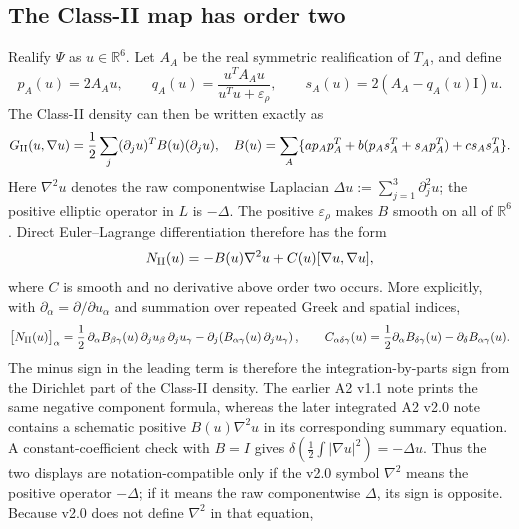 \documentclass[11pt]{article}
\numberwithin{equation}{section}
\theoremstyle{definition}
\newcommand{\R}{\mathbb R}
\newcommand{\Id}{\mathrm I}
\newcommand{\eps}{\varepsilon}
\begin{document}
\subsection{The Class-II map has order two}

Realify $\Psi$ as $u\in\R^6$.  Let $A_A$ be the real symmetric realification
of $T_A$, and define
\begin{equation}
 p_A(u)=2A_Au,\qquad q_A(u)=\frac{u^TA_Au}{u^Tu+\eps_\rho},\qquad
 s_A(u)=2(A_A-q_A(u)\Id)u.
 \label{eq:realified-coeff}
\end{equation}
The Class-II density can then be written exactly as
\begin{equation}
 G_{\rm II}(u,\nabla u)=\frac12\sum_j(\partial_j u)^T B(u)(\partial_j u),
 \quad
 B(u)=\sum_A\{a p_Ap_A^T+b(p_As_A^T+s_Ap_A^T)+c s_As_A^T\}.
 \label{eq:B-map}
\end{equation}
Here $\nabla^2u$ denotes the raw componentwise Laplacian $\Delta u:=\sum_{j=1}^3\partial_j^2u$; the positive elliptic operator in $L$ is $-\Delta$.  The positive $\eps_\rho$ makes $B$ smooth on all of $\R^6$.  Direct
Euler--Lagrange differentiation therefore has the form
\begin{equation}
 N_{\rm II}(u)=-B(u)\nabla^2u+C(u)[\nabla u,\nabla u],
 \label{eq:N-map}
\end{equation}
where $C$ is smooth and no derivative above order two occurs.  More explicitly,
with $\partial_\alpha=\partial/\partial u_\alpha$ and summation over repeated
Greek and spatial indices,
\begin{equation}
 \bigl[N_{\rm II}(u)\bigr]_\alpha
 =\frac12\,\partial_\alpha B_{\beta\gamma}(u)\,
       \partial_j u_\beta\,\partial_j u_\gamma
  -\partial_j\!\left(B_{\alpha\gamma}(u)\,\partial_j u_\gamma\right),
 \qquad
 C_{\alpha\delta\gamma}(u)
 =\frac12\partial_\alpha B_{\delta\gamma}(u)
  -\partial_\delta B_{\alpha\gamma}(u).
 \label{eq:euler-classii}
\end{equation}
The minus sign in the leading term is therefore the integration-by-parts sign
from the Dirichlet part of the Class-II density.  The earlier A2 v1.1 note
prints the same negative component formula, whereas the later integrated A2
v2.0 note contains a schematic positive $B(u)\nabla^2u$ in its corresponding
summary equation.  A constant-coefficient check with $B=I$ gives
$\delta(\frac12\int|\nabla u|^2)=-\Delta u$.  Thus the two displays are
notation-compatible only if the v2.0 symbol $\nabla^2$ means the positive
operator $-\Delta$; if it means the raw componentwise $\Delta$, its sign is
opposite.  Because v2.0 does not define $\nabla^2$ in that equation,
\end{document}
